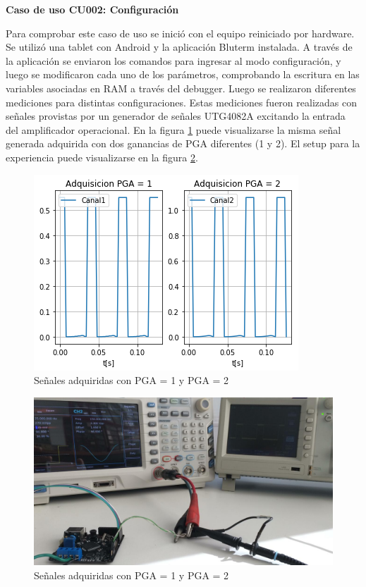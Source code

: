 \textbf{Caso de uso CU002: Configuración}

Para comprobar este caso de uso se inició con el equipo reiniciado por hardware. Se utilizó una tablet con Android y la aplicación Bluterm instalada. A través de la aplicación se enviaron los comandos para ingresar al modo configuración, y luego se modificaron cada uno de los parámetros, comprobando la escritura en las variables asociadas en RAM a través del debugger. Luego se realizaron diferentes mediciones para distintas configuraciones. Estas mediciones fueron realizadas con señales provistas por un generador de señales UTG4082A excitando la entrada del amplificador operacional. En la figura \ref{fig:confPGA} puede visualizarse la misma señal generada adquirida con dos ganancias de PGA diferentes (1 y 2). El setup para la experiencia puede visualizarse en la figura \ref{fig:confPGAexp}.

\begin{figure} [!htpb]
    \centering
    \includegraphics[width=\textwidth]{./Figures/confPGA.png}
    \caption{Señales adquiridas con PGA = 1 y PGA = 2}
    \label{fig:confPGA}
\end{figure}

\begin{figure} [!htpb]
    \centering
    \includegraphics[width=\textwidth]{Figures/confPGAexp.jpeg}
    \caption{Señales adquiridas con PGA = 1 y PGA = 2}
    \label{fig:confPGAexp}
\end{figure}

